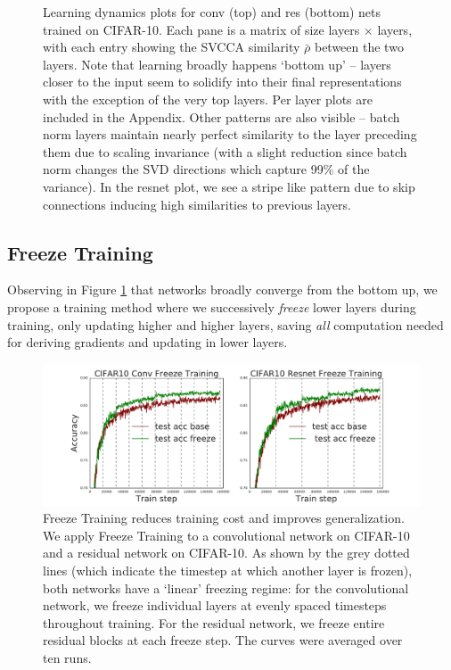 \documentclass{article} %
\begin{document}
\begin{figure}[ht]
  \vspace*{0.5cm}

  \caption{\small Learning dynamics plots for conv (top) and res (bottom) nets trained on CIFAR-10. Each pane is a matrix of size layers $\times$ layers, with each entry showing the SVCCA similarity $\bar{\rho}$ between the two layers. Note that learning broadly happens `bottom up' -- layers closer to the input seem to solidify into their final representations with the exception of the very top layers. Per layer plots are included in the Appendix. Other patterns are also visible -- batch norm layers maintain nearly perfect similarity to the layer preceding them due to scaling invariance (with a slight reduction since batch norm changes the SVD directions which capture 99\% of the variance). In the resnet plot, we see a stripe like pattern due to skip connections inducing high similarities to previous layers.
}
   \label{fig-single-pane}
   \vspace*{-0.9em}
 \end{figure}


\subsection{Freeze Training}
\label{sec:freeze}

Observing in Figure \ref{fig-single-pane} that networks broadly converge from the bottom up, we propose a training method where we successively \textit{freeze} lower layers during training, only updating higher and higher layers, saving \textit{all} computation needed for deriving gradients and updating in lower layers. 

 \begin{figure}
    \begin{center}
      \includegraphics[width=0.8\columnwidth]{figures_nips/Freeze_plots.pdf}
      \vspace*{-0.7em}
   \end{center}
   \caption{ \small Freeze Training reduces training cost and improves generalization. We apply Freeze Training to a convolutional network on CIFAR-10 and a residual network on CIFAR-10. As shown by the grey dotted lines (which indicate the timestep at which another layer is frozen), both networks have a `linear' freezing regime: for the convolutional network, we freeze individual layers at evenly spaced timesteps throughout training. For the residual network, we freeze entire residual blocks at each freeze step. The curves were averaged over ten runs.}
   \label{fig-freeze-training}
   \vspace*{-1.0em}
 \end{figure}
\end{document}
